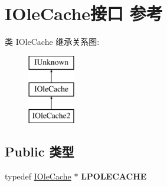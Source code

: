 \hypertarget{interface_i_ole_cache}{}\section{I\+Ole\+Cache接口 参考}
\label{interface_i_ole_cache}
类 I\+Ole\+Cache 继承关系图\+:\begin{figure}[H]
\begin{center}
\leavevmode
\includegraphics[height=3.000000cm]{interface_i_ole_cache}
\end{center}
\end{figure}
\subsection*{Public 类型}
\begin{DoxyCompactItemize}
\item 
\mbox{\label{interface_i_ole_cache_a7567c763f9c48859136663ee347263dc}} 
typedef \hyperlink{interface_i_ole_cache}{I\+Ole\+Cache} $\ast$ {\bfseries L\+P\+O\+L\+E\+C\+A\+C\+HE}
\end{DoxyCompactItemize}
